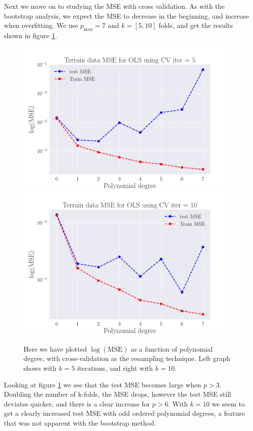 \documentclass[reprint,english,notitlepage,aps,nobalancelastpage,nofootinbib]{revtex4-1}  %
\begin{document}
Next we move on to studying the MSE with cross validation. As with the bootstrap analysis, we expect the MSE to decrease in the beginning, and increase when overfitting. We use $p_\text{max} = 7$ and $k=[5,10]$ folds, and get the results shown in figure \ref{fig:terrain_OLS_MSE_CV}.

\begin{figure}[H]
	\includegraphics[width=\linewidth]{SRTM_MSE_OLS_n50_pol7_CV_re5_log.pdf}
	\endminipage\hfill
	\includegraphics[width=\linewidth]{SRTM_MSE_OLS_n50_pol7_CV_re10_log.pdf}
	\endminipage
	\caption{Here we have plotted $\log(\text{MSE})$ as a function of polynomial degree, with cross-validation as the resampling technique. Left graph shows with $k=5$ iterations, and right with $k=10$.}
  \label{fig:terrain_OLS_MSE_CV}
\end{figure}
Looking at figure \ref{fig:terrain_OLS_MSE_CV} we see that the test MSE becomes large when $p>3$. Doubling the number of k-folds, the MSE drops, however the test MSE still deviates quicker, and there is a clear increase for $p>6$. With $k=10$ we seem to get a clearly increased test MSE with odd ordered polynomial degrees, a feature that was not apparent with the bootstrap method.
\end{document}
